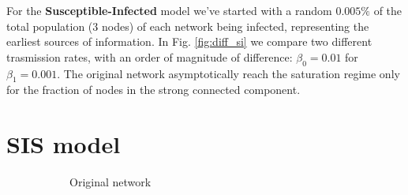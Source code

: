 For the \textbf{Susceptible-Infected} model we've started with a random $0.005\%$ of the total population ($3$ nodes)
    of each network being infected, representing the earliest sources of information.
    In Fig. \ref{fig:diff_si} we compare two different trasmission rates, with an order of magnitude of difference:
    $ \beta_0 =0.01$ for   $\beta_1 = 0.001$. The original network asymptotically reach the saturation regime only for the fraction of nodes
    in the strong connected component.



\section{SIS model} %
\label{sec:sis_model}
    \begin{figure}[H]
        \centering
        \begin{subfigure}{0.3\textwidth}
            \caption{Original network}
            \label{diff_sis}
        \end{subfigure}
        \begin{subfigure}{0.3\textwidth}
\end{subfigure}
\end{figure}
